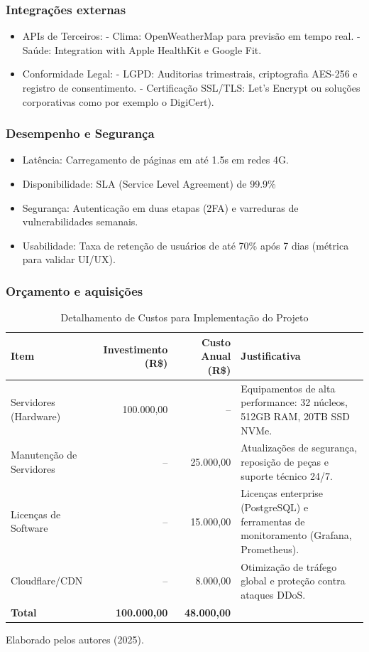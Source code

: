 \documentclass[a5paper, 12pt]{article}
\begin{document}
\subsubsection{Integrações externas}
\begin{itemize}[]
\item APIs de Terceiros:
- Clima: OpenWeatherMap para previsão em tempo real.
- Saúde: Integration with Apple HealthKit e Google Fit.
\item Conformidade Legal:
- LGPD: Auditorias trimestrais, criptografia AES-256 e registro de consentimento.
- Certificação SSL/TLS: Let's Encrypt ou soluções corporativas como por exemplo o DigiCert).
\end{itemize}

\subsubsection*{Desempenho e Segurança}
\begin{itemize}[]
\item Latência: Carregamento de páginas em até 1.5s em redes 4G.
\item Disponibilidade: SLA (Service Level Agreement) de 99.9\% 
\item Segurança: Autenticação em duas etapas (2FA) e varreduras de vulnerabilidades semanais.
\item Usabilidade: Taxa de retenção de usuários de até 70\% após 7 dias (métrica para validar UI/UX).
\end{itemize}

\subsubsection{Orçamento e aquisições}
\begin{table}[h]
\centering
\caption{Detalhamento de Custos para Implementação do Projeto}
\label{tab:custos}
\begin{tabular}{@{} >{\raggedright}p{2.5cm} r r p{3.5cm} @{}}
\toprule
\textbf{Item} & \textbf{Investimento (R\$)} & \textbf{Custo Anual (R\$)} & \textbf{Justificativa} \\
\midrule
Servidores (Hardware) & 100.000,00 & -- & Equipamentos de alta performance: 32 núcleos, 512GB RAM, 20TB SSD NVMe. \\
\addlinespace
Manutenção de Servidores & -- & 25.000,00 & Atualizações de segurança, reposição de peças e suporte técnico 24/7. \\
\addlinespace
Licenças de Software & -- & 15.000,00 & Licenças enterprise (PostgreSQL) e ferramentas de monitoramento (Grafana, Prometheus). \\
\addlinespace
Cloudflare/CDN & -- & 8.000,00 & Otimização de tráfego global e proteção contra ataques DDoS. \\
\bottomrule
\textbf{Total} & \textbf{100.000,00} & \textbf{48.000,00} & \\
\bottomrule
\end{tabular}

\smallskip
Elaborado pelos autores (2025).
\end{table}
\end{document}
